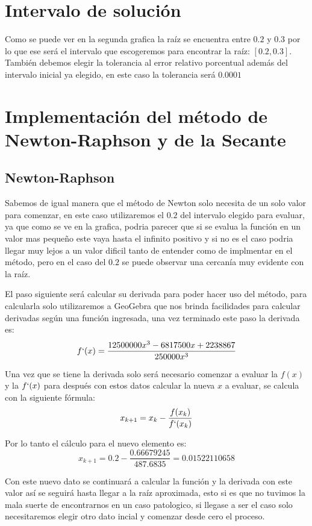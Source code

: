 \documentclass{article}
\begin{document}
\section{Intervalo de solución}
Como se puede ver en la segunda grafica la raíz se encuentra entre $0.2$ y $0.3$ por lo que ese será el intervalo que escogeremos para encontrar la raíz: $[0.2, 0.3]$. 
También debemos elegir la tolerancia al error relativo porcentual además del intervalo inicial ya elegido, en este caso la tolerancia será $0.0001$%

\section{Implementación del método de Newton-Raphson y de la Secante}
\subsection{Newton-Raphson}
Sabemos de igual manera que el método de Newton solo necesita de un solo valor para comenzar, en este caso utilizaremos el $0.2$ del intervalo elegido para evaluar, ya que como se ve en la grafica, podria parecer que si se evalua la función en un valor mas pequeño este vaya hasta el infinito positivo y si no es el caso
podria llegar muy lejos a un valor dificil tanto de entender como de implmentar en el método, pero en el caso del $0.2$ se puede observar una cercanía muy evidente con la raíz.

El paso siguiente será calcular su derivada para poder hacer uso del método, para calcularla solo utilizaremos 
a GeoGebra que nos brinda facilidades para calcular derivadas según una función ingresada, una vez terminado este 
paso la derivada es: $$f`(x)= \frac{12500000x^3-6817500x+2238867}{250000x^3}$$

Una vez que se tiene la derivada solo será necesario comenzar a evaluar la $f(x)$ y la $f`(x)$ para después con 
estos datos calcular la nueva $x$ a evaluar, se calcula con la siguiente fórmula: $$x_{k+1}=x_k-\frac{f(x_k)}{f`(x_k)}$$

Por lo tanto el cálculo para el nuevo elemento es: $$x_{k+1}=0.2-\frac{0.66679245}{487.6835}= 0.01522110658$$

Con este nuevo dato se continuará a calcular la función y la derivada con este valor así se seguirá hasta llegar a 
la raíz aproximada, esto si es que no tuvimos la mala suerte de encontrarnos en un caso patologico, si llegase a ser 
el caso solo necesitaremos elegir otro dato incial y comenzar desde cero el proceso.
\end{document}

